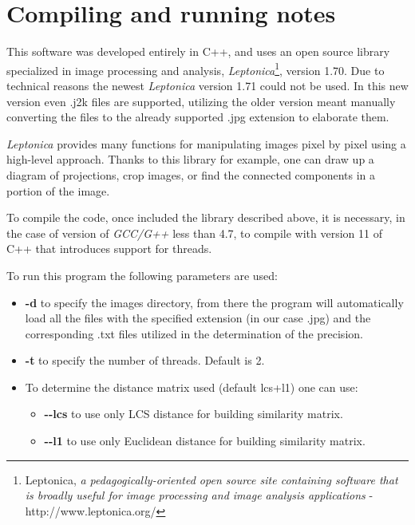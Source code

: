 \section{Compiling and running notes}

This software was developed entirely in C++, and uses an open source library specialized in image processing and analysis, \emph{Leptonica}\footnote{Leptonica, \emph{a pedagogically-oriented open source site containing software that is broadly useful for image processing and image analysis applications} -http://www.leptonica.org/}, version 1.70.
Due to technical reasons the newest \emph{Leptonica} version 1.71 could not be used. In this new version even .j2k files are supported, utilizing the older version meant manually converting the files to the already supported .jpg extension to elaborate them. 

\emph{Leptonica} provides many functions for manipulating images pixel by pixel using a high-level approach. Thanks to this library for example, one can draw up a diagram of projections, crop images, or find the connected components in a portion of the image.

To compile the code, once included the library described above, it is necessary, in the case of version of \emph{GCC/G++} less than 4.7, to compile with version 11 of C++ that introduces support for threads.

To run this program the following parameters are used:
\begin{itemize}
\item \textbf{-d} to specify the images directory, from there the program will automatically load all the files with the specified extension (in our case .jpg) and the corresponding .txt files utilized in the determination of the precision.
\item \textbf{-t} to specify the number of threads. Default is 2.
\item To determine the distance matrix used (default lcs+l1) one can use:
\begin{itemize}
\item \textbf{-\--lcs} to use only LCS distance for building similarity matrix.
\item \textbf{-\--l1} to use only Euclidean distance for building similarity matrix.
\end{itemize}
\end{itemize}